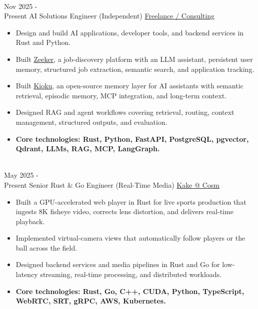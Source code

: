\documentclass[letterpaper]{twentysecondcv}
\begin{document}
\begin{twenty}

\twentyitem
    {\\
    Nov 2025 - \\ Present}
    {AI Solutions Engineer (Independent)}
    {\href{https://zeeker.business/}{Freelance / Consulting}}
    {}
    {
    \begin{itemize}
    \item Design and build AI applications, developer tools, and backend services in Rust and Python.
    \item Built \href{https://zeeker.business/}{Zeeker}, a job-discovery platform with an LLM assistant, persistent user memory, structured job extraction, semantic search, and application tracking.
    \item Built \href{https://github.com/felipemeriga/kioku}{Kioku}, an open-source memory layer for AI assistants with semantic retrieval, episodic memory, MCP integration, and long-term context.
    \item Designed RAG and agent workflows covering retrieval, routing, context management, structured outputs, and evaluation.
    \item \textbf{Core technologies: Rust, Python, FastAPI, PostgreSQL, pgvector, Qdrant, LLMs, RAG, MCP, LangGraph.}
    \end{itemize}
    }

\twentyitem
    {\\
    May 2025 - \\ Present}
    {Senior Rust \& Go Engineer (Real-Time Media)}
    {\href{https://kake.co/}{Kake @ Cosm}}
    {}
    {
    \begin{itemize}
    \item Built a GPU-accelerated web player in Rust for live sports production that ingests 8K fisheye video, corrects lens distortion, and delivers real-time playback.
    \item Implemented virtual-camera views that automatically follow players or the ball across the field.
    \item Designed backend services and media pipelines in Rust and Go for low-latency streaming, real-time processing, and distributed workloads.
    \item \textbf{Core technologies: Rust, Go, C++, CUDA, Python, TypeScript, WebRTC, SRT, gRPC, AWS, Kubernetes.}
    \end{itemize}
    }

\end{twenty}
\pagebreak
\end{document}
